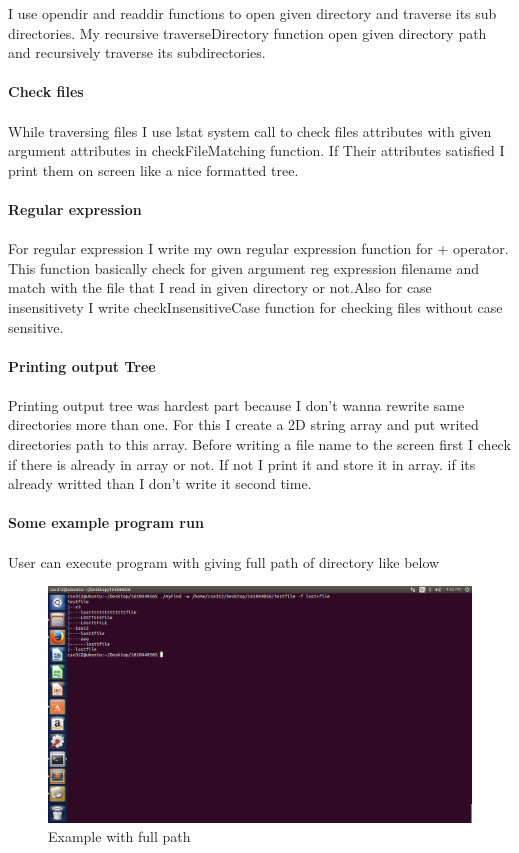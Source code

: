 \documentclass{article}
\begin{document}
I use opendir and readdir functions to open given directory and traverse its sub directories. My recursive traverseDirectory function open given directory path and recursively traverse its subdirectories.\\
\\
\textbf{Check files} \\
\\
While traversing files I use lstat system call to check files attributes with given argument attributes in checkFileMatching function. If Their attributes satisfied I print them on screen like a nice formatted tree.\\
\\
\textbf{Regular expression} \\
\\
For regular expression I write my own regular expression function for + operator. This function basically check for given argument reg expression filename and match with the file that I read in given directory or not.Also for case insensitivety I write checkInsensitiveCase function for checking files without case sensitive.\\
\\
\textbf{Printing output Tree}\\
\\
Printing output tree was hardest part because I don't wanna rewrite same directories more than one. For this I create a 2D string array and put writed directories path to this array. Before writing a file name to the screen first I check if there is already in array or not. If not I print it and store it in array. if its already writted than I don't write it second time.\\
\\
\textbf{Some example program run}\\
\\
User can execute program with giving full path of directory like below
\begin{figure}[h!]
\centering
\includegraphics[scale=0.3]{example-run1.png}
\caption{Example with full path}
\label{fig:example-run1.png}
\end{figure}
\end{document}
